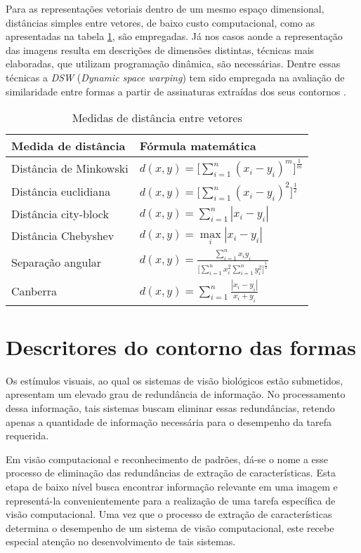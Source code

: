 Para as representações vetoriais dentro de um mesmo espaço dimensional, distâncias simples entre vetores, de baixo custo computacional, como as apresentadas na tabela \ref{tbl:distance}, são empregadas. Já nos casos aonde a representação das imagens resulta em descrições de dimensões distintas, técnicas mais elaboradas, que utilizam programação dinâmica, são necessárias. Dentre essas técnicas a \emph{DSW} (\emph{Dynamic space warping}) tem sido empregada na avaliação de similaridade entre formas a partir de assinaturas extraídas dos seus contornos \cite{Alajlan20117}. 

\begin{table}
\centering
\caption{\label{tbl:distance}Medidas de distância entre vetores}
\begin{tabular}[]{ll}
\hline
Medida de distância&Fórmula matemática\\
\hline
Distância de Minkowski&$d(x,y) = \Big[\sum\limits_{i=1}^{n}(x_i-y_i)^m\Big]^\frac{1}{m}$\\
Distância euclidiana&$d(x,y) = \Big[\sum\limits_{i=1}^{n}(x_i-y_i)^2\Big]^\frac{1}{2}$\\
Distância city-block&$d(x,y)= \sum\limits_{i=1}^{n}|x_i-y_i|$\\
Distância Chebyshev&$d(x,y)= \max\limits_{i}|x_i-y_i|$\\
Separação angular&$d(x,y)=\frac{\sum\limits_{i=1}^n{x_iy_i}}{\Big[\sum\limits_{i=1}^n{x_i^2}\sum\limits_{i=1}^n{y_i^2}\Big]^\frac{1}{2}}$\\
Canberra&$d(x,y) = \sum\limits_{i=1}^n\frac{|x_i-y_i|}{x_i+y_i}$\\
\hline
\end{tabular}
\end{table}

\section{\label{chap:contour}Descritores do contorno das formas}

Os estímulos visuais, ao qual os sistemas de visão biológicos estão submetidos, apresentam um elevado grau de redundância de informação. No processamento dessa informação, tais sistemas buscam eliminar essas redundâncias, retendo apenas a quantidade de informação necessária para o desempenho da tarefa requerida.  

Em visão computacional e reconhecimento de padrões, dá-se o nome a esse processo de eliminação das redundâncias de extração de características. Esta etapa de baixo nível busca encontrar informação relevante em uma imagem e representá-la convenientemente para a realização de uma tarefa específica de visão computacional. Uma vez que o processo de extração de características determina o desempenho de um sistema de visão computacional, este recebe especial atenção no desenvolvimento de tais sistemas.

